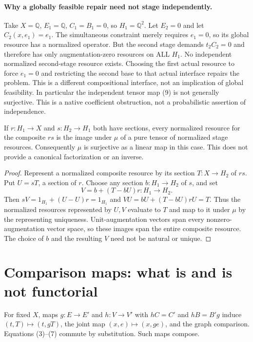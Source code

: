 \documentclass[11pt]{article}
\begin{document}
\paragraph{Why a globally feasible repair need not stage independently.}
Take $X=\mathbb Q$, $E_1=\mathbb Q$, $C_1=B_1=0$, so $H_1=\mathbb Q^2$. Let $E_2=0$ and let $C_2(x,e_1)=e_1$. The simultaneous constraint merely requires $e_1=0$, so its global resource has a normalized operator. But the second stage demands $t_2C_2=0$ and therefore has only augmentation-zero resources on ALL $H_1$. No independent normalized second-stage resource exists. Choosing the first actual resource to force $e_1=0$ and restricting the second base to that actual interface repairs the problem. This is a different compositional interface, not an implication of global feasibility. In particular the independent tensor map (9) is not generally surjective. This is a native coefficient obstruction, not a probabilistic assertion of independence.

\begin{proposition}
If $r:H_1\to X$ and $s:H_2\to H_1$ both have sections, every normalized resource for the composite $rs$ is the image under $\mu$ of a pure tensor of normalized stage resources. Consequently $\mu$ is surjective as a linear map in this case. This does not provide a canonical factorization or an inverse.
\end{proposition}
\begin{proof}
Represent a normalized composite resource by its section $T:X\to H_2$ of $rs$. Put $U=sT$, a section of $r$. Choose any section $b:H_1\to H_2$ of $s$, and set
\[
 V=b+(T-bU)r:H_1\to H_2.
\]
Then $sV=1_{H_1}+(U-U)r=1_{H_1}$ and $VU=bU+(T-bU)rU=T$. Thus the normalized resources represented by $U,V$ evaluate to $T$ and map to it under $\mu$ by the representing uniqueness. Unit-augmentation vectors span every nonzero-augmentation vector space, so these images span the entire composite resource. The choice of $b$ and the resulting $V$ need not be natural or unique.
\end{proof}

\section{Comparison maps: what is and is not functorial}
For fixed $X$, maps $g:E\to E'$ and $h:V\to V'$ with $hC=C'$ and $hB=B'g$ induce $(t,T)\mapsto(t,gT)$, the joint map $(x,e)\mapsto(x,ge)$, and the graph comparison. Equations (3)--(7) commute by substitution. Such maps compose.
\end{document}

